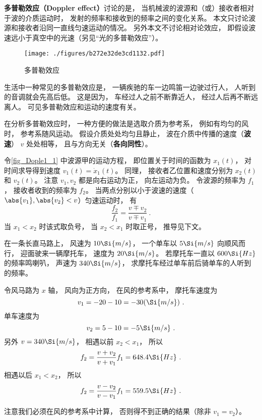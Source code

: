 

\textbf{多普勒效应（Doppler effect）}讨论的是， 当机械波的波源和（或）接收者相对于波的介质运动时， 发射的频率和接收到的频率之间的变化关系。 本文只讨论波源和接收者沿同一直线匀速运动的情况。 另外本文不讨论相对论效应， 即假设波速远小于真空中的光速（另见“光的多普勒效应”）。

\begin{figure}[ht]
\centering
\texttt{[image: ./figures/b272e32de3cd1132.pdf]}
\caption{多普勒效应} \label{fig_Dople1_1}
\end{figure}

\begin{example}{}
生活中一种常见的多普勒效应是， 一辆疾驰的车一边鸣笛一边驶过行人， 人听到的音调就会先高后低。 这是因为， 车经过人之前不断靠近人， 经过人后再不断远离人。 可见多普勒效应和运动的速度有关。
\end{example}

在分析多普勒效应时， 一种方便的做法是选取介质为参考系， 例如有均匀的风时， 参考系随风运动。 假设介质处处均匀且静止， 波在介质中传播的速度（\textbf{波速}） $v$ 处处相等， 且与方向无关（\textbf{各向同性}）。

令\autoref{fig_Dople1_1} 中波源甲的运动方程， 即位置关于时间的函数为 $x_1(t)$， 对时间求导得到速度 $v_1(t) = \dot{x}_1(t)$。 同理， 接收者乙位置和速度分别为 $x_2(t)$ 和 $v_2(t)$。 注意 $v_1, v_2$ 都是向右运动为正， 向左运动为负。 令波源的频率为 $f_1$， 接收者收到的频率为 $f_2$。 当两点分别以小于波速的速度（$\abs{v_1}, \abs{v_2} < v$）匀速运动时， 有
\begin{equation}\label{eq_Dople1_1}
\frac{f_2}{f_1} = \frac{v \mp v_2}{v \mp v_1}~.
\end{equation}
当 $x_1 < x_2$ 时该式取负号， 当 $x_2 < x_1$ 时取正号， 推导见下文。

\begin{exercise}{}
在一条长直马路上， 风速为 $10\Si{m/s}$， 一个单车以 $5\Si{m/s}$ 向顺风而行， 迎面驶来一辆摩托车， 速度为 $20\Si{m/s}$。 若摩托车一直以 $600\Si{Hz}$ 的频率鸣喇叭， 声速为 $340\Si{m/s}$， 求摩托车经过单车前后骑单车的人听到的频率。

令风马路为 $x$ 轴， 风向为正方向， 在风的参考系中， 摩托车速度为
\begin{equation}
v_1 = -20 - 10 = -30(\Si{m/s})~.
\end{equation}
单车速度为
\begin{equation}
v_2 = 5 - 10 = -5\Si{m/s}~.
\end{equation}
另外 $v = 340\Si{m/s}$， 相遇以前 $x_2 < x_1$， 所以
\begin{equation}
f_2 = \frac{v + v_2}{v + v_1} f_1 = 648.4\Si{Hz}~.
\end{equation}
相遇以后 $x_1 < x_2$， 所以
\begin{equation}
f_2 = \frac{v - v_2}{v - v_1} f_1 = 559.5\Si{Hz}~.
\end{equation}
\end{exercise}
注意我们必须在风的参考系中计算， 否则得不到正确的结果（除非 $v_1 = v_2$）。

